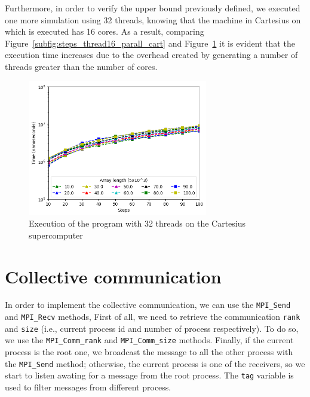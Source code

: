 \documentclass[a4paper]{article}
\begin{document}
Furthermore, in order to verify the upper bound previously defined, we executed one more simulation using 32 threads, knowing that the machine in Cartesius on which is executed has 16 cores. As a result, comparing Figure~\ref{subfig:steps_thread16_parall_cart} and Figure~\ref{fig:steps_thread32_parall_cart} it is evident that the execution time increases due to the overhead created by generating a number of threads greater than the number of cores.

\begin{figure}[htbp]
\centering
\includegraphics[width=0.7\textwidth]{res/parallel/array_thread_32_steps_res_cartesius.png}
\caption{Execution of the program with 32 threads on the Cartesius supercomputer}
\label{fig:steps_thread32_parall_cart}
\end{figure}
\newpage

\section{Collective communication}

In order to implement the collective communication, we can use the \texttt{MPI\_Send} and \texttt{MPI\_Recv} methods, First of all, we need to retrieve the communication \texttt{rank} and \texttt{size} (i.e., current process id and number of process respectively). To do so, we use the \texttt{MPI\_Comm\_rank} and \texttt{MPI\_Comm\_size} methods. Finally, if the current process is the root one, we broadcast the message to all the other process with the \texttt{MPI\_Send} method; otherwise, the current process is one of the receivers, so we start to listen awating for a message from the root process. The \texttt{tag} variable is used to filter messages from different process.
\end{document}
